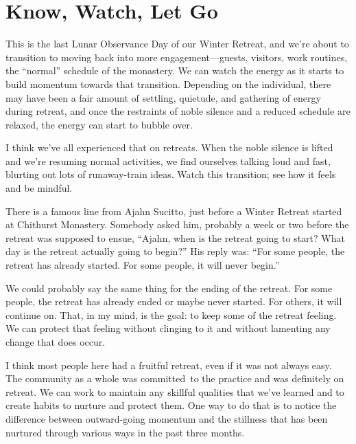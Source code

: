
\chapter{Know, Watch, Let Go}

This is the last Lunar Observance Day of our Winter Retreat, and we're about to transition to moving back into more engagement---guests, visitors, work routines, the ``normal'' schedule of the monastery. We can watch the energy as it starts to build momentum towards that transition. Depending on the individual, there may have been a fair amount of settling, quietude, and gathering of energy during retreat, and once the restraints of noble silence and a reduced schedule are relaxed, the energy can start to bubble over.{\parfillskip=0pt \par}

I think we've all experienced that on retreats. When the noble silence is lifted and we're resuming normal activities, we find ourselves talking loud and fast, blurting out lots of runaway-train ideas. Watch this transition; see how it feels and be mindful.

There is a famous line from Ajahn Sucitto, just before a Winter Retreat started at Chithurst Monastery. Somebody asked him, probably a week or two before the retreat was supposed to ensue, ``Ajahn, when is the retreat going to start? What day is the retreat actually going to begin?'' His reply was: ``For some people, the retreat has already started. For some people, it will never begin.''

We could probably say the same thing for the ending of the retreat. For some people, the retreat has already ended or maybe never started. For others, it will continue on. That, in my mind, is the goal: to keep some of the retreat feeling. We can protect that feeling without clinging to it and without lamenting any change that does occur.

I think most people here had a fruitful retreat, even if it was not always easy. The community as a whole was \mbox{committed to} the practice and was definitely on retreat. We can work to maintain any skillful qualities that we've learned and to create habits to nurture and protect them. One way to do that is to notice the difference between outward-going momentum and the stillness that has been nurtured through various ways in the past three months.

